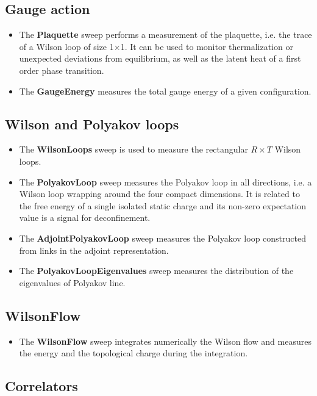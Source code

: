 \documentclass[11pt,a4paper]{article}
\begin{document}
\subsection{Gauge action}
\begin{itemize}
\item The \textbf{Plaquette} sweep performs a measurement of the plaquette, i.e. the trace of a Wilson loop of size 1$\times$1. It can be used to monitor thermalization or unexpected deviations from equilibrium, as well as the latent heat of a first order phase transition.
\item The \textbf{GaugeEnergy} measures the total gauge energy of a given configuration.
\end{itemize}

\subsection{Wilson and Polyakov loops}

\begin{itemize}
\item The \textbf{WilsonLoops} sweep is used to measure the rectangular $R\times T$ Wilson loops. 
\item The \textbf{PolyakovLoop} sweep measures the Polyakov loop in all directions, i.e. a Wilson loop wrapping around the four compact dimensions. It is related to the free energy of a single isolated static charge and its non-zero expectation value is a signal for deconfinement.
\item The \textbf{AdjointPolyakovLoop} sweep measures the Polyakov loop constructed from links in the adjoint representation.
\item The \textbf{PolyakovLoopEigenvalues} sweep measures the distribution of the eigenvalues of Polyakov line.
\end{itemize}

\subsection{WilsonFlow}

\begin{itemize}
\item The \textbf{WilsonFlow} sweep integrates numerically the Wilson flow and measures the energy and the topological charge during the integration.
\end{itemize}

\subsection{Correlators}
\end{document}
